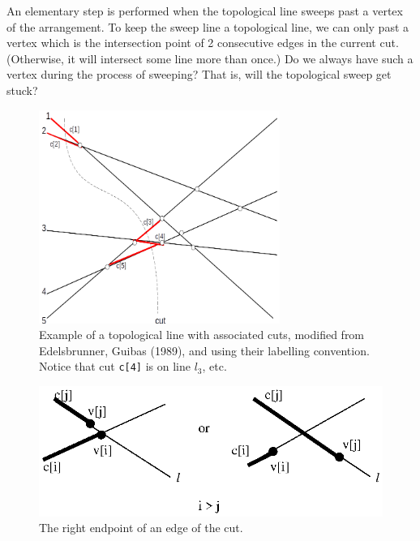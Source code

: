 \documentclass[12pt]{article}
\begin{document}
        An elementary step is performed when the topological line sweeps past
        a vertex of the arrangement. To keep the sweep line a topological
        line, we can only past a vertex which is the intersection point of 2
        consecutive edges in the current cut. (Otherwise, it will intersect
        some line more than once.) Do we always have such a vertex during the
        process of sweeping? That is, will the topological sweep get stuck?

        \begin{figure}
            \center
            \includegraphics[width=0.7\textwidth]{linecut.png}
            \caption{Example of a topological line with associated cuts, modified from Edelsbrunner, Guibas (1989), and using their labelling convention. Notice that cut \texttt{c[4]} is on line $l_3$, etc.}
            \label{figure.linecut} 
        \end{figure}

        

        \newpage

        \begin{figure}[h]
            \center
            \includegraphics[viewport=244 333 371 394]{r_endpt.eps}
            \caption{The right endpoint of an edge of the cut.}
            \label{figure.r_endpt}
        \end{figure}
\end{document}
